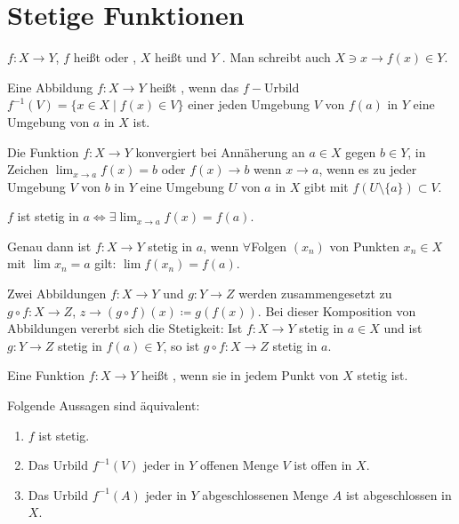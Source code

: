 \section{Stetige Funktionen}
$ f\colon X\rightarrow Y $, $ f $ hei\ss t  oder , $ X $ hei\ss t  und $ Y $ . Man schreibt auch $ X\ni x\rightarrow f(x)\in Y $.\\
\begin{definition}
Eine Abbildung $ f\colon X\rightarrow Y $ hei\ss t , wenn das $ f- $Urbild $ f^{-1}(V)=\lbrace x\in X\mid f(x)\in V\rbrace $ einer jeden Umgebung $ V $ von $ f(a) $ in $ Y $ eine Umgebung von $ a $ in $ X $ ist.
\end{definition}
\begin{definition}
Die Funktion $ f\colon X\rightarrow Y $ konvergiert bei Ann\"aherung an $ a\in X $ gegen $ b\in Y $, in Zeichen $ \lim_{x\to a} f(x)=b $ oder $ f(x)\rightarrow b $ wenn $ x\rightarrow a $, wenn es zu jeder Umgebung $ V $ von $ b $ in $ Y $ eine Umgebung $ U $ von $ a $ in $ X $ gibt mit $ f(U\setminus\lbrace a\rbrace)\subset V $.
\end{definition}
\begin{bemerkung*}
$ f $ ist stetig in $ a\Leftrightarrow\exists\lim_{x\to a}f(x)=f(a) $.
\end{bemerkung*}
\begin{satz}[Folgenkriterium]
Genau dann ist $ f\colon X\rightarrow Y $ stetig in $ a $, wenn $ \forall $Folgen $ (x_n) $ von Punkten $ x_n\in X $ mit $ \lim x_n=a $ gilt: $ \lim f(x_n)=f(a) $.
\end{satz}
Zwei Abbildungen $ f\colon X\rightarrow Y $ und $ g\colon Y\rightarrow Z $ werden zusammengesetzt zu $ g\circ f\colon X\rightarrow Z $, $ z\rightarrow (g\circ f)(x)\coloneqq g(f(x)) $. Bei dieser Komposition von Abbildungen vererbt sich die Stetigkeit: Ist $ f\colon X\rightarrow Y $ stetig in $ a\in X $ und ist $ g\colon Y\rightarrow Z $ stetig in $ f(a)\in Y $, so ist $ g\circ f\colon X\rightarrow Z $ stetig in $ a $.\\
\begin{definition}
Eine Funktion $ f\colon X\rightarrow Y $ hei\ss t , wenn sie in jedem Punkt von $ X $ stetig ist.
\end{definition}
\begin{satz}[Stetigkeitskriterium]
Folgende Aussagen sind \"aquivalent:
\begin{enumerate}
\item $ f $ ist stetig.
\item Das Urbild $ f^{-1}(V) $ jeder in $ Y $ offenen Menge $ V $ ist offen in $ X $.
\item Das Urbild $ f^{-1}(A) $ jeder in $ Y $ abgeschlossenen Menge $ A $ ist abgeschlossen in $ X $.
\end{enumerate}
\end{satz}
